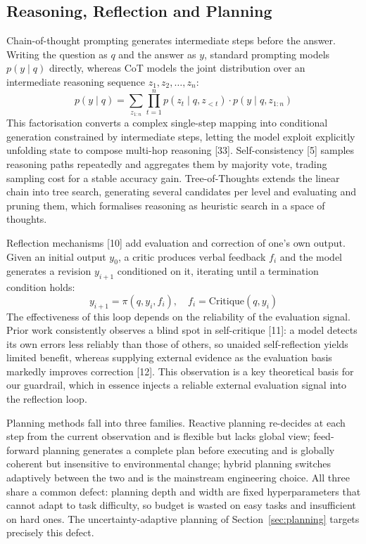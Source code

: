 \documentclass[journal,10pt,a4paper]{IEEEtran}
\begin{document}
\subsection{Reasoning, Reflection and Planning}
Chain-of-thought prompting generates intermediate steps before the answer. Writing the question as $q$ and the answer as $y$, standard prompting models $p(y\mid q)$ directly, whereas CoT models the joint distribution over an intermediate reasoning sequence $z_1,z_2,\dots,z_n$:
\begin{equation}
p(y\mid q)=\sum_{z_{1:n}}\prod_{t=1}^{n}p(z_t\mid q,z_{<t})\cdot p(y\mid q,z_{1:n})
\end{equation}
This factorisation converts a complex single-step mapping into conditional generation constrained by intermediate steps, letting the model exploit explicitly unfolding state to compose multi-hop reasoning [33]. Self-consistency [5] samples reasoning paths repeatedly and aggregates them by majority vote, trading sampling cost for a stable accuracy gain. Tree-of-Thoughts extends the linear chain into tree search, generating several candidates per level and evaluating and pruning them, which formalises reasoning as heuristic search in a space of thoughts.

Reflection mechanisms [10] add evaluation and correction of one's own output. Given an initial output $y_0$, a critic produces verbal feedback $f_i$ and the model generates a revision $y_{i+1}$ conditioned on it, iterating until a termination condition holds:
\begin{equation}
y_{i+1}=\pi(q,y_i,f_i),\quad f_i=\mathrm{Critique}(q,y_i)
\end{equation}
The effectiveness of this loop depends on the reliability of the evaluation signal. Prior work consistently observes a blind spot in self-critique [11]: a model detects its own errors less reliably than those of others, so unaided self-reflection yields limited benefit, whereas supplying external evidence as the evaluation basis markedly improves correction [12]. This observation is a key theoretical basis for our guardrail, which in essence injects a reliable external evaluation signal into the reflection loop.

Planning methods fall into three families. Reactive planning re-decides at each step from the current observation and is flexible but lacks global view; feed-forward planning generates a complete plan before executing and is globally coherent but insensitive to environmental change; hybrid planning switches adaptively between the two and is the mainstream engineering choice. All three share a common defect: planning depth and width are fixed hyperparameters that cannot adapt to task difficulty, so budget is wasted on easy tasks and insufficient on hard ones. The uncertainty-adaptive planning of Section~\ref{sec:planning} targets precisely this defect.
\end{document}
